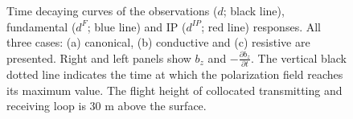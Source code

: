 \documentclass[extra,mreferee]{gji}
\newcommand{\dip}{d^{IP}}
\begin{document}
\begin{figure}
  \caption{Time decaying curves of the observations  ($d$; black line), fundamental ($d^F$; blue line) and IP ($\dip$; red line) responses. All three cases: (a) canonical, (b) conductive and (c) resistive are presented. Right and left panels show $b_z$ and $-\frac{\partial b_z}{\partial t}$. The vertical black dotted line indicates the time at which the polarization field reaches its maximum value. The flight height of collocated transmitting and receiving loop is 30 m above the surface.}
  \label{F:Three_IPresp}
\end{figure}
\end{document}
